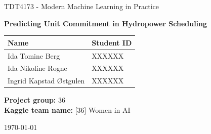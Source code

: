 \documentclass[11pt,a4paper]{article}
\begin{document}
\begin{titlepage}
    \thispagestyle{empty}
    \centering
    \vspace*{3cm}

    {\Large TDT4173 - Modern Machine Learning in Practice\par}
    \vspace{0.5cm}
    {\LARGE\bfseries Predicting Unit Commitment in Hydropower Scheduling\par}

    \vspace{2.5cm}

    \begin{tabular}{ll}
        \toprule
        \textbf{Name} & \textbf{Student ID} \\
        \midrule
        Ida Tomine Berg         & XXXXXX \\
        Ida Nikoline Rogne      & XXXXXX \\
        Ingrid Kapstad Østgulen & XXXXXX \\
        \bottomrule
    \end{tabular}

    \vspace{1.5cm}

    \textbf{Project group:} 36 \\[0.3cm]
    \textbf{Kaggle team name:} [36] Women in AI

    \vfill

    \today

\end{titlepage}

\newpage
\tableofcontents
\newpage

\setlength{\parindent}{0pt}
\setlength{\parskip}{1em}











\nocite{*}



\appendix


\end{document}
